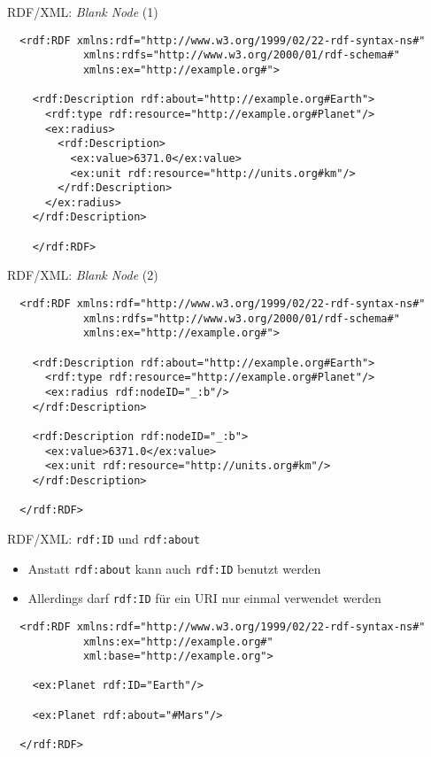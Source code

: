 \documentclass{beamer}
\begin{document}
\begin{frame}[fragile]{RDF/XML: \emph{Blank Node} (1)}
	
	\small
	\begin{lstlisting}
  <rdf:RDF xmlns:rdf="http://www.w3.org/1999/02/22-rdf-syntax-ns#"
            xmlns:rdfs="http://www.w3.org/2000/01/rdf-schema#"
            xmlns:ex="http://example.org#">
    
    <rdf:Description rdf:about="http://example.org#Earth">
      <rdf:type rdf:resource="http://example.org#Planet"/>
      <ex:radius>
        <rdf:Description>
          <ex:value>6371.0</ex:value>
          <ex:unit rdf:resource="http://units.org#km"/>
        </rdf:Description>
      </ex:radius>
    </rdf:Description>
    
    </rdf:RDF>
	\end{lstlisting}
	
\end{frame}

\begin{frame}[fragile]{RDF/XML: \emph{Blank Node} (2)}
	
	\small
	\begin{lstlisting}
  <rdf:RDF xmlns:rdf="http://www.w3.org/1999/02/22-rdf-syntax-ns#"
            xmlns:rdfs="http://www.w3.org/2000/01/rdf-schema#"
            xmlns:ex="http://example.org#">
	
    <rdf:Description rdf:about="http://example.org#Earth">
      <rdf:type rdf:resource="http://example.org#Planet"/>
      <ex:radius rdf:nodeID="_:b"/>
    </rdf:Description>
	
    <rdf:Description rdf:nodeID="_:b">
      <ex:value>6371.0</ex:value>
      <ex:unit rdf:resource="http://units.org#km"/>
    </rdf:Description>
	
  </rdf:RDF>
	\end{lstlisting}
	
\end{frame}

\begin{frame}[fragile]{RDF/XML: \texttt{rdf:ID} und \texttt{rdf:about}}
	
	\begin{itemize}
		\item Anstatt \texttt{rdf:about} kann auch \texttt{rdf:ID} benutzt werden
		\item Allerdings darf \texttt{rdf:ID} für ein URI nur einmal verwendet werden
    \end{itemize}
   
   	\small
   	\begin{lstlisting} 
  <rdf:RDF xmlns:rdf="http://www.w3.org/1999/02/22-rdf-syntax-ns#"
            xmlns:ex="http://example.org#"
            xml:base="http://example.org">
    
    <ex:Planet rdf:ID="Earth"/>
    
    <ex:Planet rdf:about="#Mars"/>
    
  </rdf:RDF>
	\end{lstlisting}
	
\end{frame}
\end{document}
